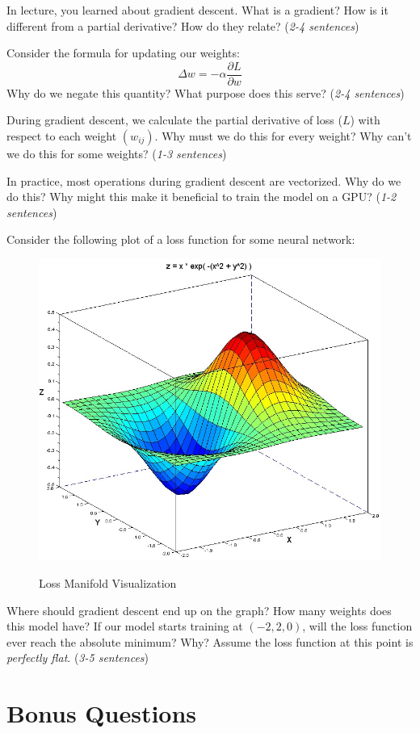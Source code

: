 \documentclass[11pt, answers]{exam}
\begin{document}
\begin{questions}
	\question
	In lecture, you learned about gradient descent. What is a gradient? How is it different from a partial derivative? How do they relate? ({\it 2-4 sentences})

	\question
	Consider the formula for updating our weights:
	$$\Delta w = -\alpha \frac{\partial L}{\partial w}$$
	Why do we negate this quantity? What purpose does this serve? ({\it 2-4 sentences})

	\question
	During gradient descent, we calculate the partial derivative of loss ($L$) with respect to each weight $(w_{ij})$. Why must we do this for every weight? Why can't we do this for some weights? ({\it 1-3 sentences})

	\question
	In practice, most operations during gradient descent are vectorized. Why do we do this? Why might this make it beneficial to train the model on a GPU? ({\it 1-2 sentences})

	\question
	Consider the following plot of a loss function for some neural network:
	\begin{figure}[H]
		\caption{Loss Manifold Visualization}
		\centering
		\includegraphics[width=0.7\linewidth]{./images/hw2-loss.png}
		\label{fig:label}
	\end{figure}
	Where should gradient descent end up on the graph? How many weights does this model have? If our model starts training at $(-2, 2, 0)$, will the loss function ever reach the absolute minimum? Why? Assume the loss function at this point is {\it perfectly flat}. ({\it 3-5 sentences})

\end{questions}

\newpage %

\section{Bonus Questions}
\end{document}
